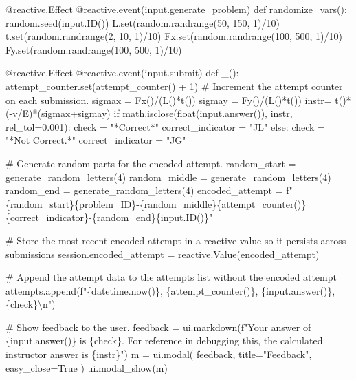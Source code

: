 \documentclass[
  letterpaper,
  DIV=11,
  numbers=noendperiod]{scrreprt}
\newenvironment{Shaded}{\begin{snugshade}}{\end{snugshade}}
\newcommand{\NormalTok}[1]{\textcolor[rgb]{0.00,0.23,0.31}{#1}}
\begin{document}
\begin{Shaded}
\begin{Highlighting}[]
\NormalTok{    @reactive.Effect}
\NormalTok{    @reactive.event(input.generate\_problem)}
\NormalTok{    def randomize\_vars():}
\NormalTok{        random.seed(input.ID())}
\NormalTok{        L.set(random.randrange(50, 150, 1)/10)}
\NormalTok{        t.set(random.randrange(2, 10, 1)/10)}
\NormalTok{        Fx.set(random.randrange(100, 500, 1)/10)}
\NormalTok{        Fy.set(random.randrange(100, 500, 1)/10)}
        
\NormalTok{    @reactive.Effect}
\NormalTok{    @reactive.event(input.submit)}
\NormalTok{    def \_():}
\NormalTok{        attempt\_counter.set(attempt\_counter() + 1)  \# Increment the attempt counter on each submission.}
\NormalTok{        sigmax = Fx()/(L()*t())}
\NormalTok{        sigmay = Fy()/(L()*t())}
\NormalTok{        instr= t()*({-}v/E)*(sigmax+sigmay)}
\NormalTok{        if math.isclose(float(input.answer()), instr, rel\_tol=0.001):}
\NormalTok{            check = "*Correct*"}
\NormalTok{            correct\_indicator = "JL"}
\NormalTok{        else:}
\NormalTok{            check = "*Not Correct.*"}
\NormalTok{            correct\_indicator = "JG"}

\NormalTok{        \# Generate random parts for the encoded attempt.}
\NormalTok{        random\_start = generate\_random\_letters(4)}
\NormalTok{        random\_middle = generate\_random\_letters(4)}
\NormalTok{        random\_end = generate\_random\_letters(4)}
\NormalTok{        encoded\_attempt = f"\{random\_start\}\{problem\_ID\}{-}\{random\_middle\}\{attempt\_counter()\}\{correct\_indicator\}{-}\{random\_end\}\{input.ID()\}"}

\NormalTok{        \# Store the most recent encoded attempt in a reactive value so it persists across submissions}
\NormalTok{        session.encoded\_attempt = reactive.Value(encoded\_attempt)}

\NormalTok{        \# Append the attempt data to the attempts list without the encoded attempt}
\NormalTok{        attempts.append(f"\{datetime.now()\}, \{attempt\_counter()\}, \{input.answer()\}, \{check\}\textbackslash{}n")}

\NormalTok{        \# Show feedback to the user.}
\NormalTok{        feedback = ui.markdown(f"Your answer of \{input.answer()\} is \{check\}. For reference in debugging this, the calculated instructor answer is \{instr\}")}
\NormalTok{        m = ui.modal(}
\NormalTok{            feedback,}
\NormalTok{            title="Feedback",}
\NormalTok{            easy\_close=True}
\NormalTok{        )}
\NormalTok{        ui.modal\_show(m)}


\end{Highlighting}
\end{Shaded}
\end{document}
